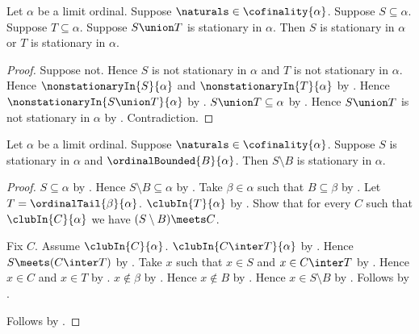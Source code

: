 \begin{proposition}\label{stationary_union_component}
    Let $\alpha$ be a limit ordinal.
    Suppose $\naturals\in\cofinality{\alpha}$.
    Suppose $S\subseteq\alpha$.
    Suppose $T\subseteq\alpha$.
    Suppose $S\union T$ is stationary in $\alpha$.
    Then $S$ is stationary in $\alpha$ or $T$ is stationary in $\alpha$.
\end{proposition}
\begin{proof}
    Suppose not.
    Hence $S$ is not stationary in $\alpha$ and
        $T$ is not stationary in $\alpha$.
    Hence $\nonstationaryIn{S}{\alpha}$ and
        $\nonstationaryIn{T}{\alpha}$
        by .
    Hence $\nonstationaryIn{S\union T}{\alpha}$
        by .
    $S\union T\subseteq\alpha$ by .
    Hence $S\union T$ is not stationary in $\alpha$
        by .
    Contradiction.
\end{proof}

\begin{theorem}\label{stationary_remove_bounded}
    Let $\alpha$ be a limit ordinal.
    Suppose $\naturals\in\cofinality{\alpha}$.
    Suppose $S$ is stationary in $\alpha$ and
        $\ordinalBounded{B}{\alpha}$.
    Then $S\setminus B$ is stationary in $\alpha$.
\end{theorem}
\begin{proof}
    $S\subseteq\alpha$ by .
    Hence $S\setminus B\subseteq\alpha$
        by .
    Take $\beta\in\alpha$ such that $B\subseteq\beta$
        by .
    Let $T=\ordinalTail{\beta}{\alpha}$.
    $\clubIn{T}{\alpha}$ by .
    Show that for every $C$ such that $\clubIn{C}{\alpha}$
        we have $(S\setminus B)\meets C$.
    \begin{subproof}
        Fix $C$.
        Assume $\clubIn{C}{\alpha}$.
        $\clubIn{C\inter T}{\alpha}$
            by .
        Hence $S\meets(C\inter T)$ by .
        Take $x$ such that $x\in S$ and $x\in C\inter T$
            by .
        Hence $x\in C$ and $x\in T$
            by .
        $x\notin\beta$ by .
        Hence $x\notin B$ by .
        Hence $x\in S\setminus B$ by .
        Follows by .
    \end{subproof}
    Follows by .
\end{proof}

